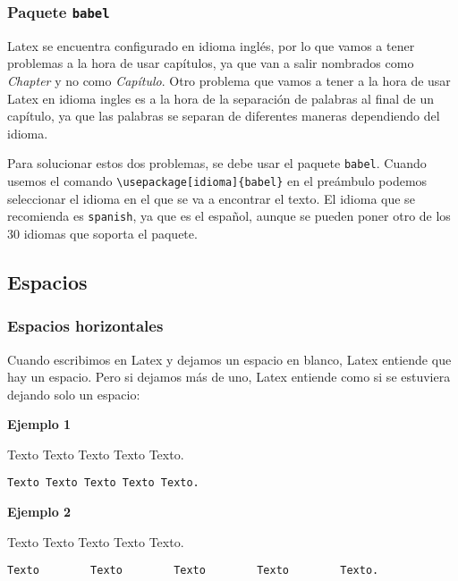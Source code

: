 	
	\subsubsection{Paquete \texttt{babel}}
	
	Latex se encuentra configurado en idioma inglés, por lo que vamos a tener problemas a la hora de usar capítulos, ya que van a salir nombrados como \textit{Chapter} y no como \textit{Capítulo}. Otro problema que vamos a tener a la hora de usar Latex en idioma ingles es a la hora de la separación de palabras al final de un capítulo, ya que las palabras se separan de diferentes maneras dependiendo del idioma.
	
	Para solucionar estos dos problemas, se debe usar el paquete \texttt{babel}. Cuando usemos el comando \verb|\usepackage[idioma]{babel}| en el preámbulo podemos seleccionar el idioma en el que se va a encontrar el texto. El idioma que se recomienda es \texttt{spanish}, ya que es el español, aunque se pueden poner otro de los 30 idiomas que soporta el paquete.
	
	\subsection{Espacios}
	
	\subsubsection{Espacios horizontales}
	
	Cuando escribimos en Latex y dejamos un espacio en blanco, Latex entiende que hay un espacio. Pero si dejamos más de uno, Latex entiende como si se estuviera dejando solo un espacio:
	
	\textbf{Ejemplo 1}
	
	Texto Texto Texto Texto Texto.
	\begin{myquote}
		\begin{lstlisting}
Texto Texto Texto Texto Texto.
		\end{lstlisting}
	\end{myquote}
		
	\textbf{Ejemplo 2}
	
	Texto        Texto        Texto        Texto        Texto.
\begin{myquote}
	\begin{lstlisting}
Texto        Texto        Texto        Texto        Texto.
	\end{lstlisting}
\end{myquote}
		

